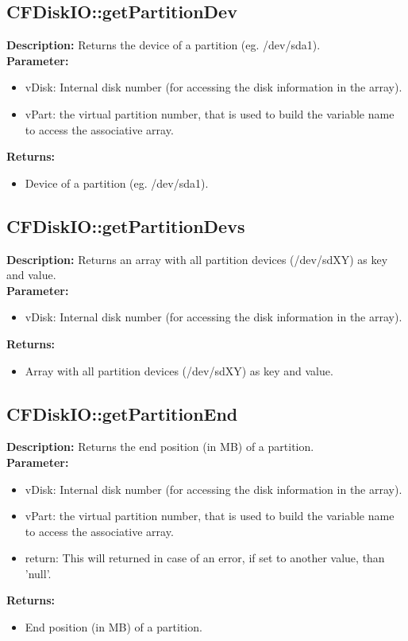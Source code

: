 \subsection{CFDiskIO::getPartitionDev}
\textbf{Description:} Returns the device of a partition (eg. /dev/sda1).\\
\textbf{Parameter:}
\begin{itemize}
\item vDisk: Internal disk number (for accessing the disk information in the array).
\item vPart: the virtual partition number, that is used to build the variable name to access the associative array.
\end{itemize}
\textbf{Returns:}
\begin{itemize}
\item Device of a partition (eg. /dev/sda1).
\end{itemize}

\subsection{CFDiskIO::getPartitionDevs}
\textbf{Description:} Returns an array with all partition devices (/dev/sdXY) as key and value.\\
\textbf{Parameter:}
\begin{itemize}
\item vDisk: Internal disk number (for accessing the disk information in the array).
\end{itemize}
\textbf{Returns:}
\begin{itemize}
\item Array with all partition devices (/dev/sdXY) as key and value.
\end{itemize}

\subsection{CFDiskIO::getPartitionEnd}
\textbf{Description:} Returns the end position (in MB) of a partition.\\
\textbf{Parameter:}
\begin{itemize}
\item vDisk: Internal disk number (for accessing the disk information in the array).
\item vPart: the virtual partition number, that is used to build the variable name to access the associative array.
\item return: This will returned in case of an error, if set to another value, than 'null'.
\end{itemize}
\textbf{Returns:}
\begin{itemize}
\item End position (in MB) of a partition.
\end{itemize}

